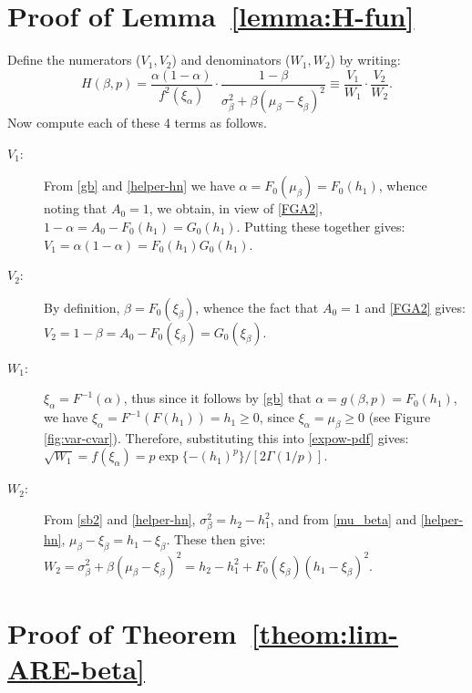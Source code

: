 \documentclass[11pt]{article}
\newcommand{\varalph}{\ensuremath{\xi_{\alpha}}}
\newcommand{\var}{\ensuremath{\xi_{\beta}}}
\newcommand{\B}{\ensuremath{\xi_{\beta}}}
\newcommand{\cvar}{\ensuremath{\mu_{\beta}}}
\newcommand{\nc}{\normalcolor}
\begin{document}
\section{Proof of Lemma~\ref{lemma:H-fun}}\label{app:lemma}
Define the numerators ($V_1,V_2$) and denominators ($W_1,W_2$) by writing: 
\[ H(\beta,p) =\frac{\alpha(1-\alpha)}{f^2(\varalph)}\cdot \frac{1-\beta}{\sigma_{\beta}^2 + \beta(\mu_{\beta} - \var)^2}\equiv \frac{V_1}{W_1}\cdot\frac{V_2}{W_2} . \]
Now compute each of these 4 terms as follows.
\begin{description}
\item[$V_1$:] From \eqref{gb} and \eqref{helper-hn} we have $\alpha =
  F_0(\mu_{\beta}) = F_0(h_1)$, whence noting that
  $A_0=1$, we obtain, in view of \eqref{FGA2},
  $1-\alpha=A_0-F_0(h_1)=G_0(h_1)$. Putting these together gives:
$V_1=\alpha(1-\alpha)=F_0(h_1)G_0(h_1)$.
\item[$V_2$:] By definition, $\beta=F_0(\var)$, whence the fact that $A_0=1$ and
\eqref{FGA2} gives: $V_2=1-\beta=A_0-F_0(\var) =G_0(\var)$.
\item[$W_1$:] $\varalph=F^{-1}(\alpha)$, thus since it follows by
  \eqref{gb} that $\alpha =g(\beta,p) = F_0(h_1)$, we have
  $\varalph=F^{-1}(F(h_1))=h_1\geq 0$, since $\varalph=\cvar\geq 0$
  (see Figure \ref{fig:var-cvar}). Therefore, substituting this into
  \eqref{expow-pdf} gives: $\sqrt{W_1}=f(\varalph)=p\exp\{-(h_1)^p\}/[2\Gamma(1/p)]$.
\item[$W_2$:] From \eqref{sb2} and \eqref{helper-hn},
  $\sigma_{\beta}^2=h_2-h_1^2$, and from \eqref{mu_beta} and
  \eqref{helper-hn}, $\cvar-\var=h_1-\var$. These then give: $W_2=\sigma_{\beta}^2+\beta(\cvar-\var)^2=h_2 -h_1^2 + F_0(\B)(h_1 -\B)^2$.
\end{description}
\nc



\section{Proof of Theorem~\ref{theom:lim-ARE-beta}}\label{app:lims-theom-beta}
 
\end{document}
